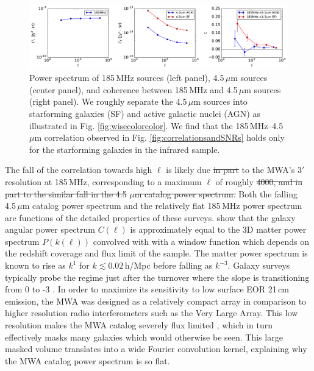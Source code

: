 \documentclass[numberedappendix]{emulateapj}
\providecommand{\DIFadd}[1]{{\protect\color{blue}\uwave{#1}}} %
\providecommand{\DIFdel}[1]{{\protect\color{red}\sout{#1}}}                      %
\providecommand{\DIFaddbegin}{} %
\providecommand{\DIFaddend}{} %
\providecommand{\DIFdelbegin}{} %
\providecommand{\DIFdelend}{} %
\begin{document}
\begin{figure}[h]
\centering
\includegraphics[width=7in]{mwa_wise_qsoagn_gal_xspec.pdf}
\caption[Auto and cross spectra of 185\,MHz and 4.5\,$\mu$m sources, for both AGN and SF cuts of the infrared catalog.]{Power spectrum of 185\,MHz sources (left panel), 4.5\,$\mu$m sources (center panel), and coherence between 185\,MHz and 4.5\,$\mu$m sources (right panel). We roughly separate the 4.5\,$\mu$m sources into starforming galaxies (SF) and active galactic nuclei (AGN) as illustrated in Fig.  \ref{fig:wisecolorcolor}. We find that the 185\,MHz--4.5\,$\mu$m correlation observed in Fig. \ref{fig:correlationsandSNRs} holds only for the starforming galaxies in the infrared sample. }
\label{fig:wisexspec}
\end{figure}

The fall of the correlation towards high $\ell$ is likely due \DIFdelbegin \DIFdel{in part }\DIFdelend to the MWA's $3'$ resolution at 185\,MHz, corresponding to a maximum $\ell$ of roughly \DIFdelbegin \DIFdel{4000, and in part to the similar fall in the 4.5}%
\DIFdel{$\mu$m catalog power spectrum. }\DIFdelend \DIFaddbegin \DIFadd{4000. }\DIFaddend Both the falling 4.5\,$\mu$m catalog power spectrum and the relatively flat 185\,MHz power spectrum are functions of the detailed properties of these surveys. \citet{tegmark02,dodelson02} show that the galaxy angular power spectrum $C(\ell)$ is approximately equal to the 3D matter power spectrum $P(k(\ell))$ convolved with with a window function which depends on the redshift coverage and flux limit of the sample. The matter power spectrum is known to rise as $k^{1}$ for $k\lesssim0.02$\,h/Mpc before falling as $k^{-3}$. Galaxy surveys typically probe the regime just after the turnover where the slope is transitioning from 0 to -3 \citep{tegmark02b}. In order to maximize its sensitivity to low surface EOR 21\,cm emission, the MWA was designed as a relatively compact array in comparison to higher resolution radio interferometers such as the Very Large Array. This low resolution makes the MWA catalog severely flux limited \citep{PattiCatalog1}, which in turn effectively masks many galaxies which would otherwise be seen. This large masked volume translates into a wide Fourier convolution kernel, explaining why the MWA catalog power spectrum is so flat. 
\end{document}

